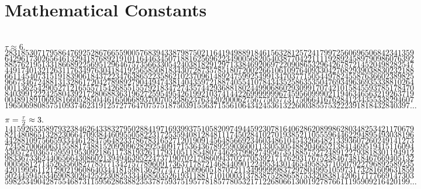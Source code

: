 \documentclass[mathematics_cheat_sheet.tex]{subfiles}
\begin{document}
\newpage
\enlargethispage{4\baselineskip}
\section{Mathematical Constants}
~\\
$\tau\approx6.$\\
$2831853071795864769252867665590057683943387987502116419498891846156328125724179972560696506842341359$\\
$6429617302656461329418768921910116446345071881625696223490056820540387704221111928924589790986076392$\\
$8857621951331866892256951296467573566330542403818291297133846920697220908653296426787214520498282547$\\
$4491740132126311763497630418419256585081834307287357851807200226610610976409330427682939038830232188$\\
$6611454073151918390618437223476386522358621023709614892475992549913470377150544978245587636602389825$\\
$9667346724881313286172042789892790449474381404359721887405541078434352586353504769349636935338810264$\\
$0011362542905271216555715426855155792183472743574429368818024499068602930991707421015845593785178470$\\
$8403991222425804392172806883631962725954954261992103741442269999999674595609990211946346563219263719$\\
$0048918910693816605285044616506689370070523862376342020006275677505773175066416762841234355338294607$\\
$196506980857510937462319125727764707575187503915563715561064342453613226003855753222391818432840397\dots$

\vspace{.3\baselineskip}$\pi={\tau\over 2}\approx3.$\\
$1415926535897932384626433832795028841971693993751058209749445923078164062862089986280348253421170679$\\
$8214808651328230664709384460955058223172535940812848111745028410270193852110555964462294895493038196$\\
$4428810975665933446128475648233786783165271201909145648566923460348610454326648213393607260249141273$\\
$7245870066063155881748815209209628292540917153643678925903600113305305488204665213841469519415116094$\\
$3305727036575959195309218611738193261179310511854807446237996274956735188575272489122793818301194912$\\
$9833673362440656643086021394946395224737190702179860943702770539217176293176752384674818467669405132$\\
$0005681271452635608277857713427577896091736371787214684409012249534301465495853710507922796892589235$\\
$4201995611212902196086403441815981362977477130996051870721134999999837297804995105973173281609631859$\\
$5024459455346908302642522308253344685035261931188171010003137838752886587533208381420617177669147303$\\
$598253490428755468731159562863882353787593751957781857780532171226806613001927876611195909216420199\dots$
\end{document}
